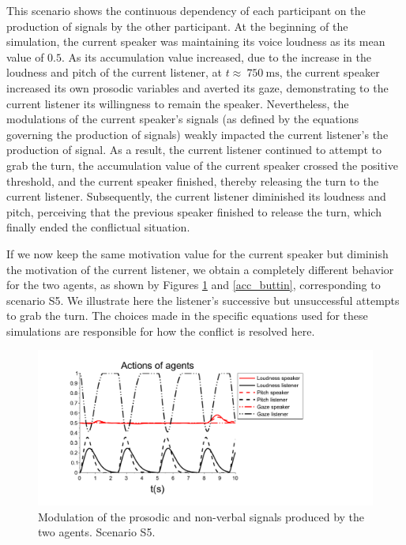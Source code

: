 \documentclass[twocolumn]{svjour3}
\begin{document}
This scenario shows the continuous dependency of each participant on the production of signals by the other participant. At the beginning of the simulation, the current speaker was maintaining its voice loudness as its mean value of $0.5$. As its accumulation value increased, due to the increase in the loudness and pitch of the current listener, at $t\approx~750~\text{ms}$, the current speaker increased its own prosodic variables and averted its gaze, demonstrating to the current listener its willingness to remain the speaker. Nevertheless, the modulations of the current speaker's signals (as defined by the equations governing the production of signals) weakly impacted the current listener's the production of signal. As a result, the current listener continued to attempt to grab the turn, the accumulation value of the current speaker crossed the positive threshold, and the current speaker finished, thereby releasing the turn to the current listener. Subsequently, the current listener diminished its loudness and pitch, perceiving that the previous speaker finished to release the turn, which finally ended the conflictual situation.

If we now keep the same motivation value for the current speaker but diminish the motivation of the current listener, we obtain a completely different behavior for the two agents, as shown by Figures \ref{simu_buttin} and \ref{acc_buttin}, corresponding to scenario S5. We illustrate here the listener's successive but unsuccessful attempts to grab the turn. The choices made in the specific equations used for these simulations are responsible for how the conflict is resolved here.  

\begin{figure}
  \centering
  \includegraphics[width=\linewidth]{figure/emerg_sc2.pdf}
  \caption{Modulation of the prosodic and non-verbal signals produced by the two agents. Scenario S5.}
  \label{simu_buttin}
\end{figure}
\end{document}
